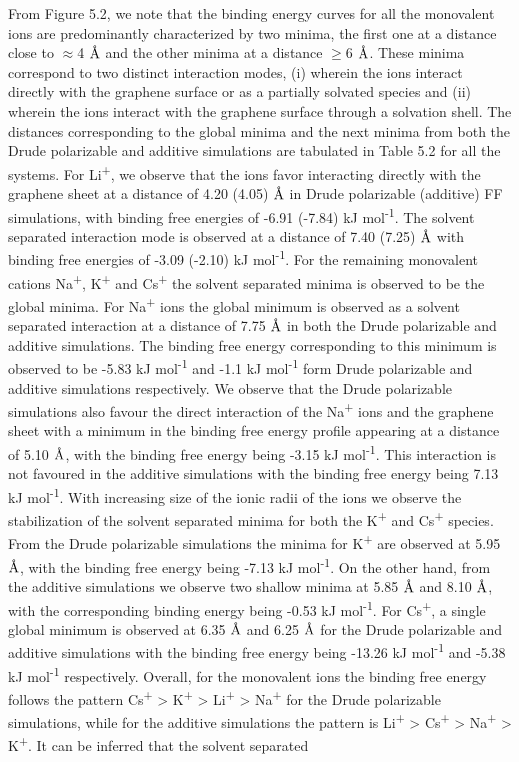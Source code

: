 From Figure 5.2, we note that the binding energy curves for all the monovalent ions are predominantly characterized by two minima, the first one at a distance close to $\approx$4 $\text{\normalfont\AA}$ and the other minima at a distance $\geq$6 $\text{\normalfont\AA}$. These minima correspond to two distinct interaction modes, (i) wherein the ions interact directly with the graphene surface or as a partially solvated species and (ii) wherein the ions interact with the graphene surface through a solvation shell. The distances corresponding to the global minima and the next minima from both the Drude polarizable and additive simulations are tabulated in Table 5.2 for all the systems. For Li\textsuperscript{+}, we observe that the ions favor interacting directly with the graphene sheet at a distance of 4.20 (4.05) $\text{\normalfont\AA}$ in Drude polarizable (additive) FF simulations, with binding free energies of -6.91 (-7.84) kJ mol\textsuperscript{-1}. The solvent separated interaction mode is observed at a distance of 7.40 (7.25) $\text{\normalfont\AA}$ with binding free energies of -3.09 (-2.10) kJ mol\textsuperscript{-1}. For the remaining monovalent cations Na\textsuperscript{+}, K\textsuperscript{+} and Cs\textsuperscript{+} the solvent separated minima is observed to be the global minima. For Na\textsuperscript{+} ions the global minimum is observed as a solvent separated interaction at a distance of 7.75 $\text{\normalfont\AA}$ in both the Drude polarizable and additive simulations. The binding free energy corresponding to this minimum is observed to be -5.83 kJ mol\textsuperscript{-1} and -1.1 kJ mol\textsuperscript{-1} form Drude polarizable and additive simulations respectively.  We observe that the Drude polarizable simulations also favour the direct interaction of the Na\textsuperscript{+} ions and the graphene sheet with a minimum in the binding free energy profile appearing at a distance of 5.10 $\text{\normalfont\AA}$, with the binding free energy being -3.15 kJ mol\textsuperscript{-1}. This interaction is not favoured in the additive simulations with the binding free energy being 7.13 kJ mol\textsuperscript{-1}. With increasing size of the ionic radii of the ions we observe the stabilization of the solvent separated minima for both the K\textsuperscript{+} and Cs\textsuperscript{+} species. From the Drude polarizable simulations the minima for K\textsuperscript{+} are observed at 5.95 $\text{\normalfont\AA}$, with the binding free energy being -7.13 kJ mol\textsuperscript{-1}. On the other hand, from the additive simulations we observe two shallow minima at 5.85 $\text{\normalfont\AA}$ and 8.10 $\text{\normalfont\AA}$, with the corresponding binding energy being -0.53 kJ mol\textsuperscript{-1}. For Cs\textsuperscript{+}, a single global minimum is observed at 6.35 $\text{\normalfont\AA}$ and 6.25 $\text{\normalfont\AA}$ for the Drude polarizable and additive simulations with the binding free energy being -13.26 kJ mol\textsuperscript{-1} and -5.38 kJ mol\textsuperscript{-1} respectively. Overall, for the monovalent ions the binding free energy follows the pattern Cs\textsuperscript{+} > K\textsuperscript{+} > Li\textsuperscript{+} > Na\textsuperscript{+} for the Drude polarizable simulations, while for the additive simulations the pattern is Li\textsuperscript{+} > Cs\textsuperscript{+} > Na\textsuperscript{+} > K\textsuperscript{+}. It can be inferred that the solvent separated 